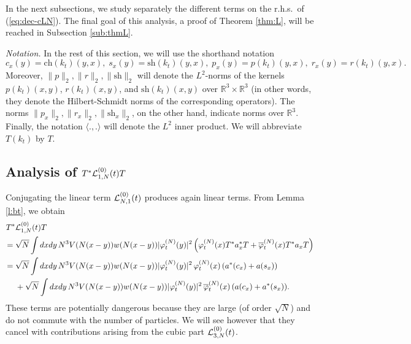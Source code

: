 \documentclass[11pt,a4paper]{article}
\newcommand{\bR}{{\mathbb R}}
\newcommand{\cL}{{\cal L}}
\begin{document}
In the next subsections, we study separately the different terms on the r.h.s.\ of (\ref{eq:dec-cLN}). The final goal of this analysis, a proof of Theorem \ref{thm:L}, will be reached in Subsection \ref{sub:thmL}.

\medskip

{\it Notation.} In the rest of this section, we will use the shorthand notation \begin{equation}\label{eq:def-csprx} 
c_x (y) = \text{ch} (k_t) (y,x), \;  s_x (y) = \text{sh} (k_t) (y,x), \; p_x (y) = p (k_t) (y,x), \; 
r_x (y) = r (k_t) (y,x). \end{equation}
Moreover, $\| p \|_2 , \| r \|_2, \|\text{sh} \|_2$ will denote the $L^2$-norms of the kernels $p (k_t) (x,y)$, $r (k_t) (x,y)$, and $\text{sh} (k_t) (x,y)$ over $\bR^3 \times \bR^3$ (in other words, they denote the Hilbert-Schmidt norms of the corresponding operators). The norms $\| p_x \|_2, \| r_x \|_2, \| \text{sh}_x \|_2$, on the other hand, indicate norms over $\bR^3$. Finally, the notation $\langle . , . \rangle$ will denote the $L^2$ inner product. We will abbreviate $T(k_t)$ by $T$.


\subsection{Analysis of $T^* \cL^{(0)}_{1,N} (t) T$}

Conjugating the linear term $\cL^{(0)}_{N,1} (t)$ produces again linear terms. {F}rom Lemma \ref{l:bt}, we obtain
\begin{equation}\label{eq:TL1T} \begin{split} T^* & \cL^{(0)}_{1,N} (t) T \\ = \; & \sqrt{N} \int dx dy \, N^3 V (N (x-y)) w (N (x-y)) |\varphi_t^{(N)} (y)|^2 \left( \varphi^{(N)}_t (x) T^* a^*_x T + \overline{\varphi}_t^{(N)} (x) T^* a_x T \right) \\ 
= \; &\sqrt{N} \int dx dy \, N^3 V (N (x-y)) w (N (x-y)) |\varphi_t^{(N)} (y)|^2 \, \varphi^{(N)}_t (x)  \, ( a^*(c_x) + a(s_x)) \\ &+ \sqrt{N} \int dx dy \, N^3 V (N (x-y)) w (N (x-y)) |\varphi_t^{(N)} (y)|^2 \, \overline{\varphi}^{(N)}_t (x)  \, ( a (c_x) + a^* (s_x)). \end{split} \end{equation}
These terms are potentially dangerous because they are large (of order $\sqrt{N}$) and do not commute with the number of particles. We will see however that they cancel with contributions arising from the cubic part $\cL_{3,N}^{(0)} (t)$. 
\end{document}
